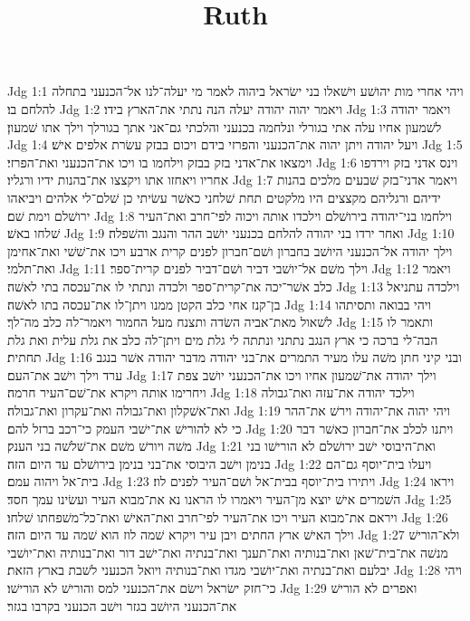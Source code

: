 

\title{Ruth}

Jdg 1:1  ויהי אחרי מות יהושׁע וישׁאלו בני ישׂראל ביהוה לאמר מי יעלה־לנו אל־הכנעני בתחלה להלחם בו׃
Jdg 1:2  ויאמר יהוה יהודה יעלה הנה נתתי את־הארץ בידו׃
Jdg 1:3  ויאמר יהודה לשׁמעון אחיו עלה אתי בגורלי ונלחמה בכנעני והלכתי גם־אני אתך בגורלך וילך אתו שׁמעון׃
Jdg 1:4  ויעל יהודה ויתן יהוה את־הכנעני והפרזי בידם ויכום בבזק עשׂרת אלפים אישׁ׃
Jdg 1:5  וימצאו את־אדני בזק בבזק וילחמו בו ויכו את־הכנעני ואת־הפרזי׃
Jdg 1:6  וינס אדני בזק וירדפו אחריו ויאחזו אתו ויקצצו את־בהנות ידיו ורגליו׃
Jdg 1:7  ויאמר אדני־בזק שׁבעים מלכים בהנות ידיהם ורגליהם מקצצים היו מלקטים תחת שׁלחני כאשׁר עשׂיתי כן שׁלם־לי אלהים ויביאהו ירושׁלם וימת שׁם׃
Jdg 1:8  וילחמו בני־יהודה בירושׁלם וילכדו אותה ויכוה לפי־חרב ואת־העיר שׁלחו באשׁ׃
Jdg 1:9  ואחר ירדו בני יהודה להלחם בכנעני יושׁב ההר והנגב והשׁפלה׃
Jdg 1:10  וילך יהודה אל־הכנעני היושׁב בחברון ושׁם־חברון לפנים קרית ארבע ויכו את־שׁשׁי ואת־אחימן ואת־תלמי׃
Jdg 1:11  וילך משׁם אל־יושׁבי דביר ושׁם־דביר לפנים קרית־ספר׃
Jdg 1:12  ויאמר כלב אשׁר־יכה את־קרית־ספר ולכדה ונתתי לו את־עכסה בתי לאשׁה׃
Jdg 1:13  וילכדה עתניאל בן־קנז אחי כלב הקטן ממנו ויתן־לו את־עכסה בתו לאשׁה׃
Jdg 1:14  ויהי בבואה ותסיתהו לשׁאול מאת־אביה השׂדה ותצנח מעל החמור ויאמר־לה כלב מה־לך׃
Jdg 1:15  ותאמר לו הבה־לי ברכה כי ארץ הנגב נתתני ונתתה לי גלת מים ויתן־לה כלב את גלת עלית ואת גלת תחתית׃
Jdg 1:16  ובני קיני חתן משׁה עלו מעיר התמרים את־בני יהודה מדבר יהודה אשׁר בנגב ערד וילך וישׁב את־העם׃
Jdg 1:17  וילך יהודה את־שׁמעון אחיו ויכו את־הכנעני יושׁב צפת ויחרימו אותה ויקרא את־שׁם־העיר חרמה׃
Jdg 1:18  וילכד יהודה את־עזה ואת־גבולה ואת־אשׁקלון ואת־גבולה ואת־עקרון ואת־גבולה׃
Jdg 1:19  ויהי יהוה את־יהודה וירשׁ את־ההר כי לא להורישׁ את־ישׁבי העמק כי־רכב ברזל להם׃
Jdg 1:20  ויתנו לכלב את־חברון כאשׁר דבר משׁה ויורשׁ משׁם את־שׁלשׁה בני הענק׃
Jdg 1:21  ואת־היבוסי ישׁב ירושׁלם לא הורישׁו בני בנימן וישׁב היבוסי את־בני בנימן בירושׁלם עד היום הזה׃
Jdg 1:22  ויעלו בית־יוסף גם־הם בית־אל ויהוה עמם׃
Jdg 1:23  ויתירו בית־יוסף בבית־אל ושׁם־העיר לפנים לוז׃
Jdg 1:24  ויראו השׁמרים אישׁ יוצא מן־העיר ויאמרו לו הראנו נא את־מבוא העיר ועשׂינו עמך חסד׃
Jdg 1:25  ויראם את־מבוא העיר ויכו את־העיר לפי־חרב ואת־האישׁ ואת־כל־משׁפחתו שׁלחו׃
Jdg 1:26  וילך האישׁ ארץ החתים ויבן עיר ויקרא שׁמה לוז הוא שׁמה עד היום הזה׃
Jdg 1:27  ולא־הורישׁ מנשׁה את־בית־שׁאן ואת־בנותיה ואת־תענך ואת־בנתיה ואת־ישׁב דור ואת־בנותיה ואת־יושׁבי יבלעם ואת־בנתיה ואת־יושׁבי מגדו ואת־בנותיה ויואל הכנעני לשׁבת בארץ הזאת׃
Jdg 1:28  ויהי כי־חזק ישׂראל וישׂם את־הכנעני למס והורישׁ לא הורישׁו׃
Jdg 1:29  ואפרים לא הורישׁ את־הכנעני היושׁב בגזר וישׁב הכנעני בקרבו בגזר׃
